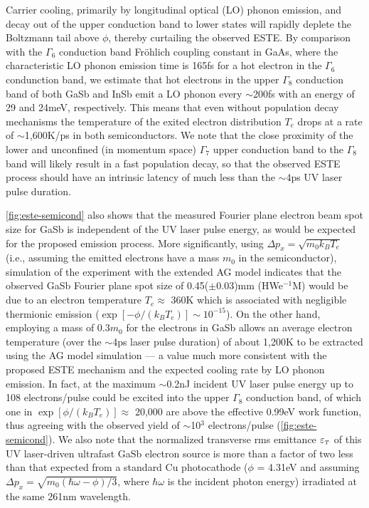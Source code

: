 Carrier cooling, primarily by longitudinal optical (LO) phonon emission, and decay out of the upper conduction band to lower states will rapidly deplete the Boltzmann tail above $\phi$, thereby curtailing the observed ESTE.
By comparison with the $\Gamma_6$ conduction band Fr\"ohlich coupling constant in GaAs, where the characteristic LO phonon emission time is 165fs for a hot electron in the $\Gamma_6$ condunction band\cite{kash_subpicosecond_1985}, we estimate that hot electrons in the upper $\Gamma_8$ conduction band of both GaSb and InSb emit a LO phonon every $\sim$200fs with an energy of 29 and 24meV, respectively.
This means that even without population decay mechanisms the temperature of the exited electron distribution $T_e$ drops at a rate of $\sim$1,600K/ps in both semiconductors.
We note that the close proximity of the lower and unconfined (in momentum space) $\Gamma_7$ upper conduction band to the $\Gamma_8$ band will likely result in a fast population decay, so that the observed ESTE process should have an intrinsic latency of much less than the $\sim$4ps UV laser pulse duration.

\ref{fig:este-semicond} also shows that the measured Fourier plane electron beam spot size for GaSb is independent of the UV laser pulse energy, as would be expected for the proposed emission process.
More significantly, using $\Delta p_x = \sqrt{m_0 k_B T_e}$ (i.e., assuming the emitted electrons have a mass $m_0$ in the semiconductor), simulation of the experiment with the extended AG model\cite{berger_semi-analytic_2010} indicates that the observed GaSb Fourier plane spot size of 0.45($\pm$0.03)mm (HWe$^{-1}$M) would be due to an electron temperature $T_e \approx$ 360K which is associated with negligible thermionic emission ($\exp[-\phi/(k_B T_e)] \sim 10^{-15}$).
On the other hand, employing a mass of 0.3$m_0$ for the electrons in GaSb allows an average electron temperature (over the $\sim$4ps laser pulse duration) of about 1,200K to be extracted using the AG model simulation --- a value much more consistent with the proposed ESTE mechanism and the expected cooling rate by LO phonon emission.
In fact, at the maximum $\sim$0.2nJ incident UV laser pulse energy up to 108 electrons/pulse could be excited into the upper $\Gamma_8$ conduction band, of which one in $\exp[\phi/(k_B T_e)] \approx$ 20,000 are above the effective 0.99eV work function, thus agreeing with the observed yield of $\sim$10$^3$ electrons/pulse (\ref{fig:este-semicond}).
We also note that the normalized transverse rms emittance $\varepsilon_{{\scriptscriptstyle T}}$ of this UV laser-driven ultrafast GaSb electron source is more than a factor of two less than that expected from a standard Cu photocathode ($\phi$ = 4.31eV and assuming $\Delta p_x = \sqrt{m_0 ( \hbar \omega - \phi ) / 3 }$, where $\hbar \omega$ is the incident photon energy\cite{dowell_quantum_2009,jensen_emittance_2010}) irradiated at the same 261nm wavelength.

